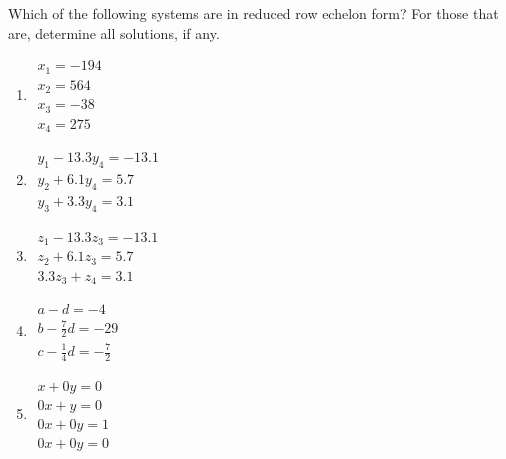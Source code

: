 \begin{exercise}
\begin{enumerate}
\begin{comment}
\begin{verbatim}
m=round(2+2*rand),n=round(2+2*rand)
for it=1:999,A=0+round(randn(m,n)*10)/10; 
    if rcond(A)<1e-4, break, end, end, 
A=A
b=0+round(randn(m,1)*10)/10
rcond(A)
x=A\b
\end{verbatim}
\end{comment}

\end{enumerate}
\end{exercise}






\begin{exercise} \label{ex:} 
Which of the following systems are in reduced row echelon form?
For those that are, determine all solutions, if any.
\begin{enumerate}
\item \(\begin{array}{l}
x_1=-194\\
x_2=564\\
x_3=-38\\
x_4=275
\end{array}\)

\item \(\begin{array}{l}
y_1-13.3y_4=-13.1\\
y_2+6.1y_4=5.7\\
y_3+3.3y_4=3.1
\end{array}\)

\item \(\begin{array}{l}
z_1-13.3z_3=-13.1\\
z_2+6.1z_3=5.7\\
3.3z_3+z_4=3.1
\end{array}\)

\item \(\begin{array}{l}a-d=-4\\
b-\frac72d=-29\\
c-\frac14d=-\frac72
\end{array}\)

\item \(\begin{array}{l}x+0y=0\\
0x+y=0\\
0x+0y=1\\
0x+0y=0
\end{array}\)


\end{enumerate}
\end{exercise}
